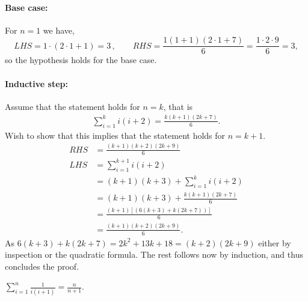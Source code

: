 \documentclass[a4paper, english, 12pt]{article} %
\begin{document}
\begin{answer}
  \paragraph{Base case:} For $n = 1$ we have,
    \begin{equation*}
    LHS = 1 \cdot (2\cdot 1 + 1) = 3\,, \qquad
    RHS = \frac{1 (1 + 1)(2\cdot 1 + 7)}{6} = \frac{1 \cdot 2 \cdot 9}{6} = 3,
  \end{equation*}
  so the hypothesis holds for the base case.

  \paragraph{Inductive step:} Assume that the statement holds for $n = k$, that
  is
  \begin{align*}
    \sum_{i=1}^k i(i+2) = \frac{k(k+1)(2k+7)}{6}.
  \end{align*}
  Wish to show that this implies that the statement holds for $n=k+1$.
  \begin{align*}
    RHS & = \frac{(k+1)(k+2)(2k+9)}{6} \\
    LHS & = \sum_{i=1}^{k+1} i(i+2)   \\
        & = (k+1)(k+3) + \sum_{i=1}^{k} i(i+2)  \\
        & = (k+1)(k+3) + \frac{k(k+1)(2k+7)}{6} \\
        & = \frac{(k+1)[(6(k+3) + k(2k+7))]}{6} \\
        & = \frac{(k+1)(k+2)(2k+9)}{6}.
  \end{align*}
  As $6(k+3) + k(2k+7) = 2k^2 + 13k + 18 = (k+2)(2k+9)$ either by inspection or
  the quadratic formula. The rest follows now by induction, and thus concludes
  the proof.
\end{answer}

\begin{subproblem}
  $\displaystyle \sum_{i = 1}^n \frac{1}{i(i+1)} = \frac{n}{n+1}$.
\end{subproblem}
\end{document}

